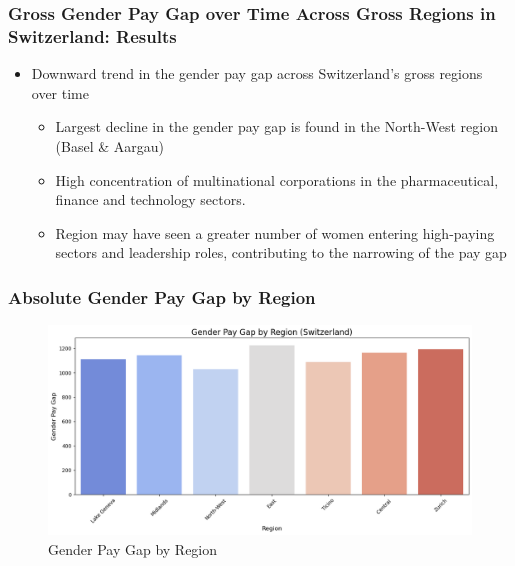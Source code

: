 \documentclass{beamer}
\begin{document}
\begin{frame}
\frametitle{Gross Gender Pay Gap over Time Across Gross Regions in Switzerland: Results}
\begin{center}
  \begin{itemize}
    \item Downward trend in the gender pay gap across Switzerland’s gross regions over time
    \begin{itemize}
    \item Largest decline in the gender pay gap is found in the North-West region (Basel & Aargau)
    \item High concentration of multinational corporations in the pharmaceutical, finance and technology sectors.
    \item Region may have seen a greater number of women entering high-paying sectors and leadership roles, contributing to the narrowing of the pay gap
    \end{itemize} 
\end{itemize} 
\end{center}
\end{frame}


\begin{frame}
\frametitle{Absolute Gender Pay Gap by Region}
\begin{center}
\begin{figure}[H]
    \includegraphics[width=\textwidth]{Figures/Gross_Pay_Gap_Region.png}
    \caption{Gender Pay Gap by Region}
    \label{fig:gap_regions}
\end{figure}
\end{center}
\end{frame}
\end{document}
